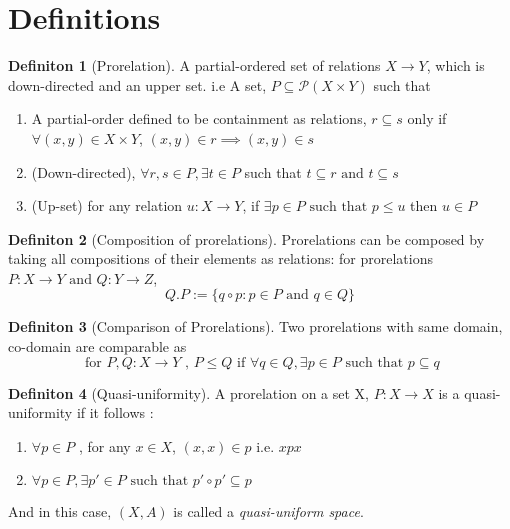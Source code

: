 \documentclass[18pt,a4paper]{article}
\theoremstyle{definition}
\newtheorem{definition}{Definiton}[section]
\begin{document}
\section{Definitions}%
\label{sec:definitions}

\begin{definition}[Prorelation] %
	A partial-ordered set of relations $X \to Y$, which is down-directed and an upper set. i.e
	A set, $P \subseteq \mathcal{P}(X \times Y)$ such that
	\begin{enumerate}[label=(\roman*)]
		\item A partial-order defined to be containment as relations, $r \subseteq s$
			only if $\forall (x,y) \in X \times Y$, $(x,y) \in r \implies (x,y)\in s$
		\item (Down-directed), $\forall r,s \in P, \exists t \in P $ such that
			$t\subseteq r \text{ and } t \subseteq s$
		\item (Up-set) for any relation $u:X\to Y$, if $\exists p \in P \text{ such that } p\leq u $
			then $u \in P$
	\end{enumerate} \end{definition} %
	\begin{definition}[Composition of prorelations] %
		Prorelations can be composed by taking all compositions of their elements as relations:
		for prorelations $P:X\to Y \text{ and } Q:Y\to Z$,
		\[ Q.P:=\{q \circ p : p \in P \text{ and } q \in Q  \} \]
	\end{definition}
	\begin{definition}[Comparison of Prorelations] %
		Two prorelations with same domain, co-domain are comparable as
		\[ \text{ for }  P,Q:X \to Y \text{ , } P \leq Q \text{ if } \forall q \in Q, \exists p \in P
		\text{ such that } p \subseteq q    \]
	\end{definition}
	\begin{definition}[Quasi-uniformity] %
		A prorelation on a set X, $P:X \to X$ is a quasi-uniformity if it follows :
		\begin{enumerate}[label=\roman*]
			\item $\forall p \in P $ , for any $x \in X$, $(x,x) \in p$ i.e. $xpx$
			\item $\forall p \in P, \exists p' \in P \text{ such that } p' \circ p' \subseteq p$
		\end{enumerate}
		And in this case, $(X,A)$ is called a \textit{quasi-uniform space}.
	\end{definition}
\end{document}
